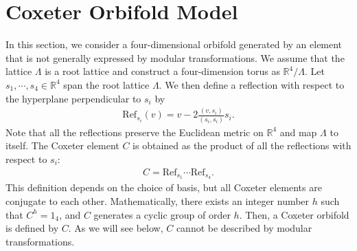\documentclass[11pt]{article}
\newcommand{\fix}[1]{\textcolor{red}{[#1]}}
\begin{document}

\section{Coxeter Orbifold Model}
\label{sec:Coxeter}

In this section, we consider a four-dimensional orbifold generated by an element that is not generally expressed by modular transformations. We assume that the lattice $\Lambda$ is a root lattice and construct a four-dimension torus as $\mathbb{R}^4/\Lambda$. Let $s_1,\cdots,s_4 \in \mathbb{R}^4$ span the root lattice $\Lambda$. We then define a reflection with respect to the hyperplane perpendicular to $s_i$ by
\begin{align}
    \text{Ref}_{s_i}(v) = v - 2\frac{(v, s_i)}{(s_i, s_i)}s_i.
\end{align}
Note that all the reflections preserve the Euclidean metric on $\mathbb{R}^4$ and map $\Lambda$ to itself. The Coxeter element $C$ is obtained as the product of all the reflections with respect to $s_i$:
\begin{align}
    C= \text{Ref}_{s_1} \cdots \text{Ref}_{s_4}.
\end{align}
This definition depends on the choice of basis, but all Coxeter elements are conjugate to each other. Mathematically, there exists an integer number $h$ such that $C^h=1_4$, and $C$ generates a cyclic group of order $h$. Then, a Coxeter orbifold is defined by $C$. As we will see below, $C$ cannot be described by modular transformations. 
\end{document}
